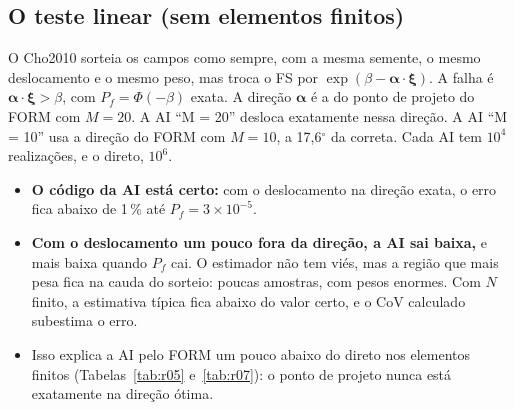 \documentclass[11pt,a4paper]{article}
\begin{document}
\subsection{O teste linear (sem elementos finitos)}\label{sec:linear}
O Cho2010 sorteia os campos como sempre, com a mesma semente, o mesmo deslocamento e o mesmo peso, mas troca o FS por
$\exp(\beta - \bm\alpha\cdot\bm\xi)$. A falha é $\bm\alpha\cdot\bm\xi > \beta$, com $P_f = \Phi(-\beta)$ exata. A direção
$\bm\alpha$ é a do ponto de projeto do FORM com $M = 20$. A AI ``M = 20'' desloca exatamente nessa direção. A AI ``M = 10'' usa
a direção do FORM com $M = 10$, a 17{,}6$^\circ$ da correta. Cada AI tem
$10^4$ realizações, e o direto, $10^6$.
\begin{table}[H]\centering\small
{}
\caption{O teste linear.}
\end{table}
\begin{itemize}
  \item \textbf{O código da AI está certo:} com o deslocamento na direção exata, o erro fica abaixo de 1\,\% até
    $P_f = 3\times10^{-5}$.
  \item \textbf{Com o deslocamento um pouco fora da direção, a AI sai baixa,} e mais baixa quando $P_f$ cai. O estimador
    não tem viés, mas a região que mais pesa fica na cauda do sorteio: poucas amostras, com pesos enormes. Com $N$ finito,
    a estimativa típica fica abaixo do valor certo, e o CoV calculado subestima o erro.
  \item Isso explica a AI pelo FORM um pouco abaixo do direto nos elementos finitos (Tabelas~\ref{tab:r05} e~\ref{tab:r07}): o ponto de projeto
    nunca está exatamente na direção ótima.
\end{itemize}
\end{document}

